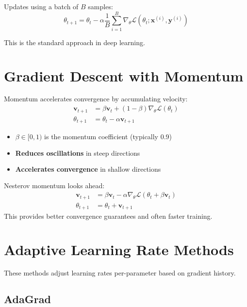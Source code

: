 Updates using a batch of $B$ samples:
\begin{equation}
\theta_{t+1} = \theta_t - \alpha \frac{1}{B}\sum_{i=1}^{B}\nabla_\theta \mathcal{L}(\theta_t; \mathbf{x}^{(i)}, \mathbf{y}^{(i)})
\end{equation}

This is the standard approach in deep learning.

\section{Gradient Descent with Momentum}

Momentum accelerates convergence by accumulating velocity:
\begin{align}
\mathbf{v}_{t+1} &= \beta \mathbf{v}_t + (1-\beta)\nabla_\theta \mathcal{L}(\theta_t) \\
\theta_{t+1} &= \theta_t - \alpha \mathbf{v}_{t+1}
\end{align}

\begin{itemize}
    \item $\beta \in [0, 1)$ is the momentum coefficient (typically 0.9)
    \item \textbf{Reduces oscillations} in steep directions
    \item \textbf{Accelerates convergence} in shallow directions
\end{itemize}

\begin{note}
Nesterov momentum looks ahead:
\begin{align}
\mathbf{v}_{t+1} &= \beta \mathbf{v}_t - \alpha \nabla_\theta \mathcal{L}(\theta_t + \beta\mathbf{v}_t) \\
\theta_{t+1} &= \theta_t + \mathbf{v}_{t+1}
\end{align}
This provides better convergence guarantees and often faster training.
\end{note}

\section{Adaptive Learning Rate Methods}

These methods adjust learning rates per-parameter based on gradient history.

\subsection{AdaGrad}

